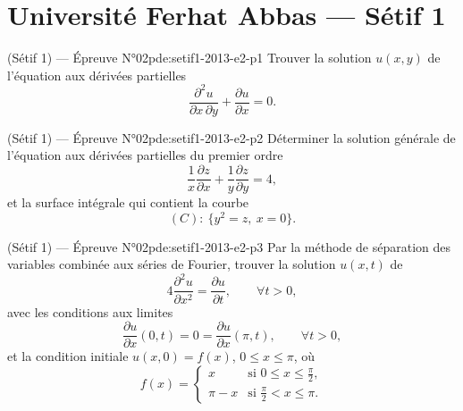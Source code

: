 \section{Université Ferhat Abbas --- Sétif 1}
\begin{problem}{(Sétif 1) — Épreuve N°02}{pde:setif1-2013-e2-p1}
Trouver la solution $u(x,y)$ de l'équation aux dérivées partielles
$$\frac{\partial^2u}{\partial x\,\partial y}+\frac{\partial u}{\partial x}=0.$$
\end{problem}
\newpage
\begin{problem}{(Sétif 1) — Épreuve N°02}{pde:setif1-2013-e2-p2}
Déterminer la solution générale de l'équation aux dérivées partielles du premier ordre
$$\frac1x\frac{\partial z}{\partial x}+\frac1y\frac{\partial z}{\partial y}=4,$$
et la surface intégrale qui contient la courbe
$$(C):\ \{y^2=z,\ x=0\}.$$
\end{problem}
\newpage
\begin{problem}{(Sétif 1) — Épreuve N°02}{pde:setif1-2013-e2-p3}
Par la méthode de séparation des variables combinée aux séries de Fourier, trouver la solution $u(x,t)$ de
$$4\frac{\partial^2u}{\partial x^2}=\frac{\partial u}{\partial t},\qquad\forall t>0,$$
avec les conditions aux limites
$$\frac{\partial u}{\partial x}(0,t)=0=\frac{\partial u}{\partial x}(\pi,t),\qquad\forall t>0,$$
et la condition initiale $u(x,0)=f(x)$, $0\le x\le\pi$, où
$$f(x)=\begin{cases}x & \text{si } 0\le x\le\tfrac{\pi}{2},\\[2pt] \pi-x & \text{si } \tfrac{\pi}{2}<x\le\pi.\end{cases}$$
\end{problem}
